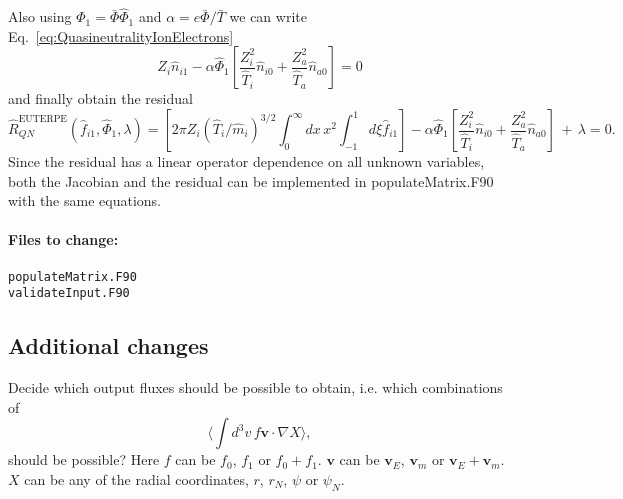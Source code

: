 \documentclass[12pt]{article}
\newcommand{\remark}[1]{\textbf{\textcolor{red}{REMARK: #1}}}
\newcommand{\na}{\nabla}
\begin{document}
Also using $\Phi_1 = \bar{\Phi} \hat{\Phi}_1$ and $\alpha = e \bar{\Phi} / \bar{T}$ we can write Eq.~\ref{eq:QuasineutralityIonElectrons} 
\begin{equation}
Z_i \hat{n}_{i 1} - \alpha \hat{\Phi}_1 \left[ \frac{Z_i^2}{\hat{T}_i} \hat{n}_{i 0} + \frac{Z_a^2}{\hat{T}_a} \hat{n}_{a 0}\right] = 0
\label{eq:QuasineutralityIonElectronsSFINCS}
\end{equation}
and finally obtain the residual 
\begin{equation}
\hat{R}_{QN}^{\mathrm{EUTERPE}}\left(\hat{f}_{i 1}, \hat{\Phi}_1, \lambda\right) =
\left[2 \pi Z_i \left(\hat{T}_i / \hat{m}_i\right)^{3/2} \int_{0}^{\infty} dx\, x^2 \int_{-1}^{1} d\xi \hat{f}_{i 1}\right]
- \alpha \hat{\Phi}_1 \left[ \frac{Z_i^2}{\hat{T}_i} \hat{n}_{i 0} + \frac{Z_a^2}{\hat{T}_a} \hat{n}_{a 0}\right] \, + \, \lambda = 0.
\label{eq:QuasineutralityIonElectronsSFINCS2}
\end{equation}
Since the residual has a linear operator dependence on all unknown variables, both the Jacobian and the residual can be implemented in populateMatrix.F90 with the same equations.

\paragraph*{\textbf{Files to change:}}
\begin{verbatim}
populateMatrix.F90
validateInput.F90
\end{verbatim}

\newpage

\subsection*{Additional changes}
Decide which output fluxes should be possible to obtain, i.e. which combinations of 
\begin{equation}
  \label{eq:OutputFluxes}
  \langle \int d^3 v \, f \bm{v} \cdot \na X \rangle,
\end{equation}
should be possible? 
Here $f$ can be $f_0$, $f_1$ or $f_0 + f_1$. 
$\bm{v}$ can be $\bm{v}_E$, $\bm{v}_m$ or $\bm{v}_E + \bm{v}_m$. 
$X$ can be any of the radial coordinates, $r$, $r_N$, $\psi$ or $\psi_N$. \\
\end{document}
